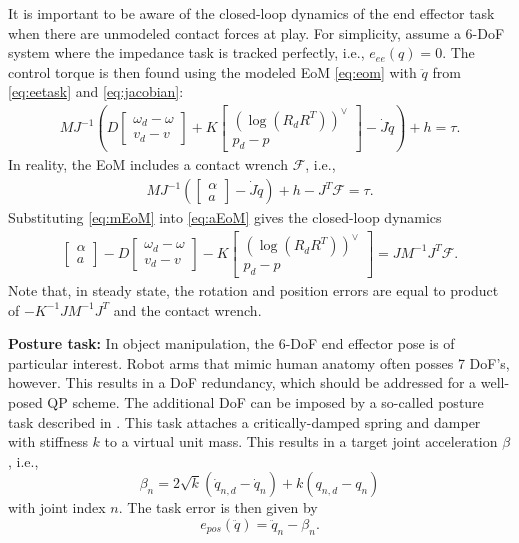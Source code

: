 \documentclass[a4paper, 10pt, conference]{ieeeconf}
\begin{document}
    It is important to be aware of the closed-loop dynamics of the end effector task when there are unmodeled contact forces at play. For simplicity, assume a 6-DoF system where the impedance task is tracked perfectly, i.e., $e_{ee}(q)=0$. The control torque is then found using the modeled EoM \eqref{eq:eom} with $\ddot{q}$ from \eqref{eq:eetask} and \eqref{eq:jacobian}:
     \begin{align} \label{eq:mEoM} MJ^{-1}
    \left(   
    D \begin{bmatrix} \omega_d - {}{\omega} \\ v_d - v \end{bmatrix}  + K \begin{bmatrix}(\log({R}_dR^T))^{\vee }  \\p_d - {p}  \end{bmatrix} -\dot{J}\dot{q}\right)+h =\tau.
    \end{align} In reality, the EoM includes a contact wrench $\mathcal{F}$, i.e., 
    \begin{align} \label{eq:aEoM} MJ^{-1} \left(
    \begin{bmatrix} \alpha \\ a \end{bmatrix}-\dot{J}\dot{q} \right ) +h -J^T\mathcal{F}=\tau.
    \end{align}
    Substituting \eqref{eq:mEoM} into \eqref{eq:aEoM} gives the closed-loop dynamics
    \begin{align} \label{eq:ee_closeloop} 
    \begin{bmatrix} \alpha \\ a \end{bmatrix}- D \begin{bmatrix} \omega_d - {}{\omega} \\ v_d - v \end{bmatrix}  - K \begin{bmatrix}(\log({R}_dR^T))^{\vee }  \\p_d - {p}  \end{bmatrix}=JM^{-1}J^T\mathcal{F}.
    \end{align}
    Note that, in steady state, the rotation and position errors are equal to product of $-K^{-1}JM^{-1}J^T$ and the contact wrench.

    \textbf{Posture task:} In object manipulation, the 6-DoF end effector pose is of particular interest. Robot arms that mimic human anatomy often posses 7 DoF's, however. This results in a DoF redundancy, which should be addressed for a well-posed QP scheme. The additional DoF can be imposed by a so-called posture task described in \cite{cisnerosRobustHumanoidControl2018}. This task attaches a critically-damped spring and damper with stiffness $k$ to a virtual unit mass. This results in a target joint acceleration $\beta$, i.e.,
    \begin{equation} \label{eq:beta} \beta_n = 2\sqrt{k}(\dot{q}_{n,d}-\dot{q}_n) +k(q_{n,d}-q_n)
    \end{equation}
    with joint index $n$. The task error is then given by
    \begin{equation} \label{eq:e_pos} e_{pos}(\ddot{q}) = 
    \ddot{q}_n - \beta_n.
    \end{equation}
\end{document}
